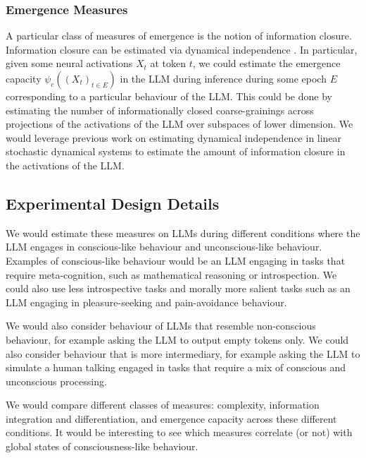 \documentclass[11pt,a4paper]{article}
\begin{document}
\subsubsection{Emergence Measures}

A particular class of measures of emergence is the notion of information closure. Information closure can be estimated via dynamical independence \citep{Barnett2023}. In particular, given some neural activations $X_t$ at token $t$, we could estimate the emergence capacity $\psi_c((X_t)_{t\in E})$ in the LLM during inference during some epoch $E$ corresponding to a particular behaviour of the LLM. This could be done by estimating the number of informationally closed coarse-grainings across projections of the activations of the LLM over subspaces of lower dimension. We would leverage previous work on estimating dynamical independence in linear stochastic dynamical systems to estimate the amount of information closure in the activations of the LLM.

\subsection{Experimental Design Details}

We would estimate these measures on LLMs during different conditions where the LLM engages in conscious-like behaviour and unconscious-like behaviour. Examples of conscious-like behaviour would be an LLM engaging in tasks that require meta-cognition, such as mathematical reasoning or introspection. We could also use less introspective tasks and morally more salient tasks such as an LLM engaging in pleasure-seeking and pain-avoidance behaviour.

We would also consider behaviour of LLMs that resemble non-conscious behaviour, for example asking the LLM to output empty tokens only. We could also consider behaviour that is more intermediary, for example asking the LLM to simulate a human talking engaged in tasks that require a mix of conscious and unconscious processing.

We would compare different classes of measures: complexity, information integration and differentiation, and emergence capacity across these different conditions. It would be interesting to see which measures correlate (or not) with global states of consciousness-like behaviour.

\end{document}
